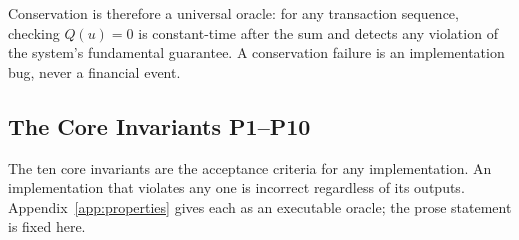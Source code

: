 Conservation is therefore a universal oracle: for any transaction sequence, checking $Q(u)=0$ is constant-time after the sum and detects any violation of the system's fundamental guarantee. A conservation failure is an implementation bug, never a financial event.

\subsection{The Core Invariants P1--P10}
\label{sec:sec15-core}

The ten core invariants are the acceptance criteria for any implementation. An implementation that violates any one is incorrect regardless of its outputs. Appendix~\ref{app:properties} gives each as an executable oracle; the prose statement is fixed here.

